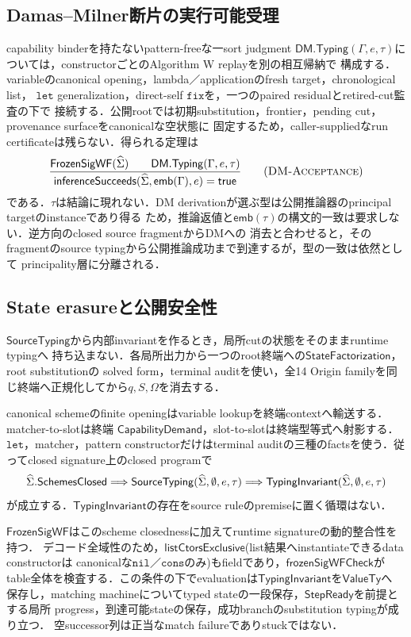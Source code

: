 \subsection{Damas--Milner断片の実行可能受理}

capability binderを持たないpattern-freeな一sort judgment
$\mathsf{DM.Typing}(\Gamma,e,\tau)$については，constructorごとのAlgorithm W replayを別の相互帰納で
構成する．variableのcanonical opening，lambda／applicationのfresh target，chronological list，
$\mathtt{let}$ generalization，direct-self $\mathtt{fix}$を，一つのpaired residualとretired-cut監査の下で
接続する．公開rootでは初期substitution，frontier，pending cut，provenance surfaceをcanonicalな空状態に
固定するため，caller-suppliedなrun certificateは残らない．得られる定理は
\[
\frac{
  \mathsf{FrozenSigWF}(\Sighat)
  \qquad
  \mathsf{DM.Typing}(\Gamma,e,\tau)
}{
  \mathsf{inferenceSucceeds}(\Sighat,\mathsf{emb}(\Gamma),e)=\mathsf{true}
}
\tag{\textsc{DM-Acceptance}}
\]
である．$\tau$は結論に現れない．DM derivationが選ぶ型は公開推論器のprincipal targetのinstanceであり得る
ため，推論返値と$\mathsf{emb}(\tau)$の構文的一致は要求しない．逆方向のclosed source fragmentからDMへの
消去と合わせると，そのfragmentのsource typingから公開推論成功まで到達するが，型の一致は依然として
principality層に分離される．

\subsection{State erasureと公開安全性}

$\mathsf{SourceTyping}$から内部invariantを作るとき，局所cutの状態をそのままruntime typingへ
持ち込まない．各局所出力から一つのroot終端への$\mathsf{StateFactorization}$，root substitutionの
solved form，terminal auditを使い，全14 Origin familyを同じ終端へ正規化してから$q,S,\Omega$を消去する．

canonical schemeのfinite openingはvariable lookupを終端contextへ輸送する．matcher-to-slotは終端
$\mathsf{CapabilityDemand}$，slot-to-slotは終端型等式へ射影する．$\mathtt{let}$，matcher，pattern
constructorだけはterminal auditの三種のfactsを使う．従ってclosed signature上のclosed programで
\[
\widehat{\Sigma}.\mathsf{SchemesClosed}
\Longrightarrow
\mathsf{SourceTyping}(\widehat{\Sigma},\emptyset,e,\tau)
\Longrightarrow
\mathsf{TypingInvariant}(\widehat{\Sigma},\emptyset,e,\tau)
\]
が成立する．$\mathsf{TypingInvariant}$の存在をsource ruleのpremiseに置く循環はない．

$\mathsf{FrozenSigWF}$はこのscheme closednessに加えてruntime signatureの動的整合性を持つ．
デコード全域性のため，$\mathsf{listCtorsExclusive}$(list結果へinstantiateできるdata constructorは
canonicalな$\mathtt{nil}$／$\mathtt{cons}$のみ)もfieldであり，$\mathsf{frozenSigWFCheck}$が
table全体を検査する．この条件の下でevaluationは$\mathsf{TypingInvariant}$を$\mathsf{ValueTy}$へ
保存し，matching machineについてtyped stateの一段保存，$\mathsf{StepReady}$を前提とする局所
progress，到達可能stateの保存，成功branchのsubstitution typingが成り立つ．
空successor列は正当なmatch failureでありstuckではない．

